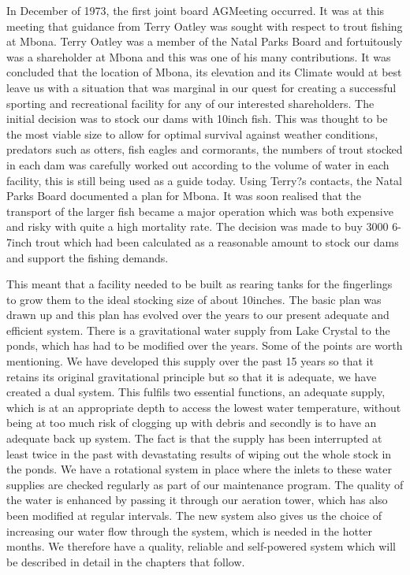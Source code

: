 In December of 1973, the first joint board AGMeeting occurred. It was at this meeting that guidance from Terry Oatley 
was sought with respect to trout fishing at Mbona. Terry Oatley was a member of the Natal Parks Board and fortuitously 
was a shareholder at Mbona and this was one of his many contributions.
It was concluded that the location of Mbona, its elevation and its Climate would at best leave us with a situation that 
was marginal in our quest for creating a successful sporting and recreational facility 
for any of our interested shareholders. The initial decision was to stock our dams with 10inch fish. 
This was thought to be the most viable size to allow for optimal survival against weather conditions, predators such as otters, 
fish eagles and cormorants, the numbers of trout stocked in each dam was carefully worked out according to the volume of water 
in each facility, this is still being used as a guide today. Using Terry?s contacts, the Natal Parks Board documented a plan for Mbona. 
It was soon realised that the transport of the larger fish became a major operation which was both expensive and risky with 
quite a high mortality rate. The decision was made to buy 3000 6-7inch trout which had been calculated as a reasonable amount 
to stock our dams and support the fishing demands.

This meant that a facility needed to be built as rearing tanks for the fingerlings to grow them to the ideal stocking size of about 10inches. 
The basic plan was drawn up and this plan has evolved over the years to our present adequate and efficient system. 
There is a gravitational water supply from Lake Crystal to the ponds, which has had to be modified over the years. 
Some of the points are worth mentioning. We have developed this supply over the past 15 years so that it retains its original 
gravitational principle but so that it is adequate, we have created a dual system. This fulfils two essential functions, an adequate supply, 
which is at an appropriate depth to access the lowest water temperature, without being at too much risk of clogging up with 
debris and secondly is to have an adequate back up system. The fact is that the supply has been interrupted at least twice 
in the past with devastating results of wiping out the whole stock in the ponds. We have a rotational system in place where the inlets 
to these water supplies are checked regularly as part of our maintenance program. The quality of the water is enhanced by passing 
it through our aeration tower, which has also been modified at regular intervals. The new system also gives us the choice of 
increasing our water flow through the system, which is needed in the hotter months. We therefore have a quality, 
reliable and self-powered system which will be described in detail in the chapters that follow.

